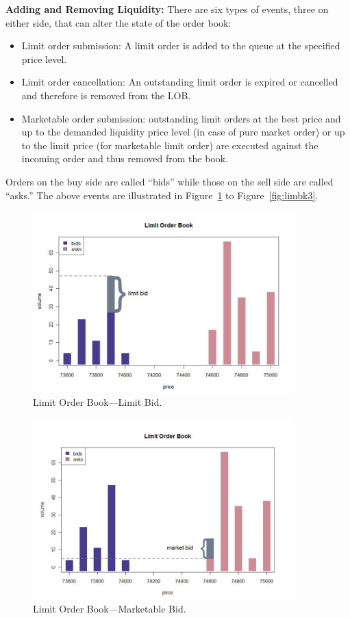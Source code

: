 \textbf{Adding and Removing Liquidity:}
There are six types of events, three on either side, that can alter the state of the order book:
	\begin{itemize}
	\item Limit order submission: A limit order is added to the queue at the specified price level.
	\item Limit order cancellation: An outstanding limit order is expired or cancelled and therefore is removed from the LOB.
	\item Marketable order submission: outstanding limit orders at the best price and up to the demanded liquidity price level (in case of pure market order) or up to the limit price (for marketable limit order) are executed against the incoming order and thus removed from the book.
	\end{itemize}


Orders on the buy side are called ``bids'' while those on the sell side are called ``asks.'' The above events are illustrated in Figure~\ref{fig:limbk1} to Figure~\ref{fig:limbk3}. \\
	\begin{figure}[!ht]
	   \centering
	   \includegraphics[width=0.9\textwidth]{chapters/chapter_trading_fund/figures/limitbk1.png} 
	   \caption{Limit Order Book---Limit Bid. \label{fig:limbk1}}
	\end{figure}
	\begin{figure}[!ht]
	   \centering
	   \includegraphics[width=0.9\textwidth]{chapters/chapter_trading_fund/figures/limitbk2.png} 
	   \caption{Limit Order Book---Marketable Bid. \label{fig:limbk2}}
	\end{figure}
	
